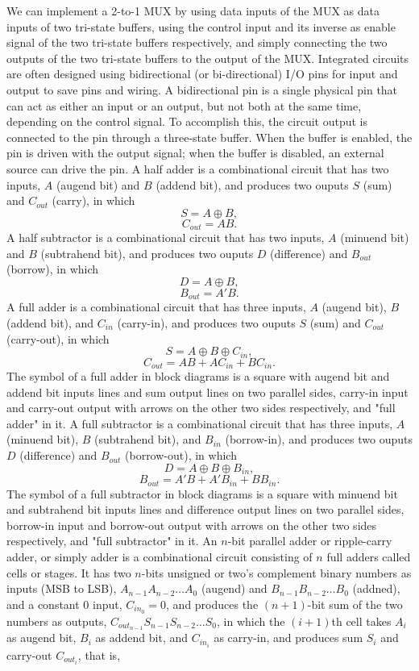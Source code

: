 \documentclass[a4paper,12pt]{article}
\begin{document}
\begin{itemize}
\begin{itemize}
\begin{itemize}
\begin{itemize}
\begin{itemize}
\begin{itemize}
\begin{itemize}
We can implement a 2-to-1 MUX by using data inputs of the MUX as data inputs of two tri-state buffers, using the control input and its inverse as enable signal of the two tri-state buffers respectively, and simply connecting the two outputs of the two tri-state buffers to the output of the MUX.
Integrated circuits are often designed using bidirectional (or bi-directional) I/O pins for input and output to save pins and wiring. A bidirectional pin is a single physical pin that can act as either an input or an output, but not both at the same time, depending on the control signal. To accomplish this, the circuit output is connected to the pin through a three-state buffer. When the buffer is enabled, the pin is driven with the output signal; when the buffer is disabled, an external source can drive the pin.
A half adder is a combinational circuit that has two inputs, $A$ (augend bit) and $B$ (addend bit), and produces two ouputs $S$ (sum) and $C_{out}$ (carry), in which
\[S=A\oplus B,\]
\[C_{out}=AB.\]
A half subtractor is a combinational circuit that has two inputs, $A$ (minuend bit) and $B$ (subtrahend bit), and produces two ouputs $D$ (difference) and $B_{out}$ (borrow), in which
\[D=A\oplus B,\]
\[B_{out}=A'B.\]
A full adder is a combinational circuit that has three inputs, $A$ (augend bit), $B$ (addend bit), and $C_{in}$ (carry-in), and produces two ouputs $S$ (sum) and $C_{out}$ (carry-out), in which
\[S=A\oplus B\oplus C_{in},\]
\[C_{out}=AB+AC_{in}+BC_{in}.\]
The symbol of a full adder in block diagrams is a square with augend bit and addend bit inputs lines and sum output lines on two parallel sides, carry-in input and carry-out output with arrows on the other two sides respectively, and "full adder" in it.
A full subtractor is a combinational circuit that has three inputs, $A$ (minuend bit), $B$ (subtrahend bit), and $B_{in}$ (borrow-in), and produces two ouputs $D$ (difference) and $B_{out}$ (borrow-out), in which
\[D=A\oplus B\oplus B_{in},\]
\[B_{out}=A'B+A'B_{in}+BB_{in}.\]
The symbol of a full subtractor in block diagrams is a square with minuend bit and subtrahend bit inputs lines and difference output lines on two parallel sides, borrow-in input and borrow-out output with arrows on the other two sides respectively, and "full subtractor" in it.
An $n$-bit parallel adder or ripple-carry adder, or simply adder is a combinational circuit consisting of $n$ full adders called cells or stages. It has two $n$-bits unsigned or two's complement binary numbers as inputs (MSB to LSB), $A_{n-1}A_{n-2}\ldots A_0$ (augend) and $B_{n-1}B_{n-2}\ldots B_0$ (addned), and a constant $0$ input, $C_{in_0}=0$, and produces the $(n+1)$-bit sum of the two numbers as outputs, $C_{out_{n-1}}S_{n-1}S_{n-2}\ldots S_0$, in which the $(i+1)$th cell takes $A_i$ as augend bit, $B_i$ as addend bit, and $C_{in_i}$ as carry-in, and produces sum $S_i$ and carry-out $C_{out_i}$, that is,

\end{itemize}
\end{itemize}
\end{itemize}
\end{itemize}
\end{itemize}
\end{itemize}
\end{itemize}
\end{document}
